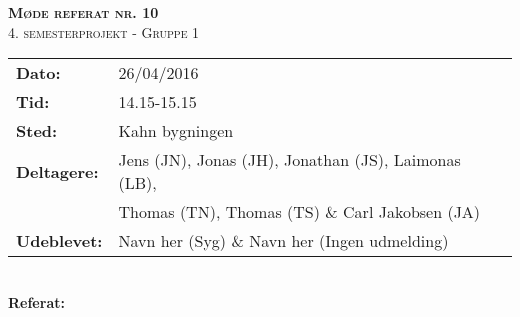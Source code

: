 
\newcommand{\HRule}{\rule{\linewidth}{0.1mm}}


	\begin{center}
		{\huge \bfseries \textsc{Møde referat nr. 10}}\\
		\textsc{\large 4. semesterprojekt - Gruppe 1}\\[0.3cm]
	\end{center}
	\begin{tabular}{ll}
	\large \textbf{Dato:} & 26/04/2016  \\ %
	\large \textbf{Tid:}  & 14.15-15.15 \\ %
	\large \textbf{Sted:} & Kahn bygningen	\\ %
	\large \textbf{Deltagere:} & Jens (JN), Jonas (JH), Jonathan (JS), Laimonas (LB), \\
	\large \textbf & Thomas (TN),  Thomas (TS) \& Carl Jakobsen (JA)\\
	\large \textbf{Udeblevet:} & Navn her (Syg) \& Navn her (Ingen udmelding)	\\
	\end{tabular}\\
	\phantom{\,}\hspace{0.1em} \large \textbf{Referat:}
